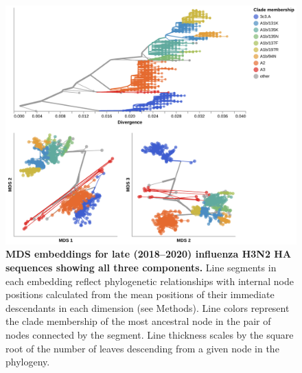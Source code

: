\begin{figure}[!h]
\includegraphics[width=\columnwidth]{figures/flu-2018-2020-mds-by-clade.png}
\caption{{\bf MDS embeddings for late (2018--2020) influenza H3N2 HA sequences showing all three components.}
Line segments in each embedding reflect phylogenetic relationships with internal node positions calculated from the mean positions of their immediate descendants in each dimension (see Methods).
Line colors represent the clade membership of the most ancestral node in the pair of nodes connected by the segment.
Line thickness scales by the square root of the number of leaves descending from a given node in the phylogeny.}\label{S_Fig_late_flu_mds_embeddings}
\end{figure}

